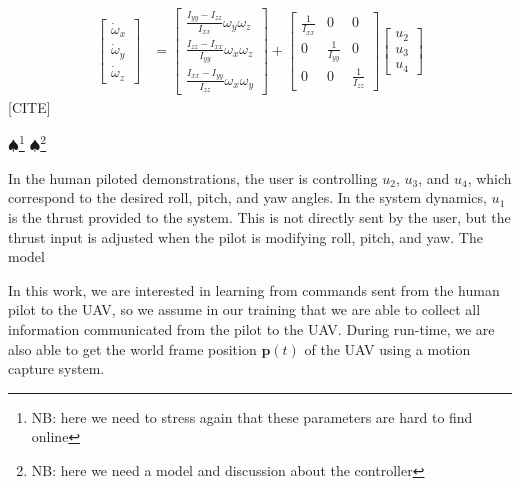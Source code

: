 \documentclass[letterpaper, 10 pt, conference]{ieeeconf}  %
\newcommand\NB[1]{$\spadesuit$\footnote{NB: #1}}
\begin{document}
\begin{equation}
\begin{aligned}
	\begin{bmatrix}\dot{\omega}_{x} \\ \dot{\omega}_{y} \\ \dot{\omega}_{z}\end{bmatrix} &= \begin{bmatrix}\frac{I_{yy} - I_{zz}}{I_{xx}} \omega_{y}\omega_{z}\\ \frac{I_{zz} - I_{xx}}{I_{yy}} \omega_{x}\omega_{z} \\ \frac{I_{xx} - I_{yy}}{I_{zz}} \omega_{x}\omega_{y} \end{bmatrix} +  \begin{bmatrix}\frac{1}{I_{xx}} & 0 & 0\\ 0 & \frac{1}{I_{yy}} & 0\\ 0 & 0 & \frac{1}{I_{zz}}\end{bmatrix} \begin{bmatrix}u_{2} \\ u_{3} \\ u_{4} \end{bmatrix}
	\end{aligned}
	\label{eq:quadrotor_dynamics} \nonumber
\end{equation} [CITE]

\NB{here we need to stress again that these parameters are hard to find online}
\NB{here we need a model and discussion about the controller}


In the human piloted demonstrations, the user is controlling $u_2$, $u_3$, and $u_4$, which correspond to the desired roll, pitch, and yaw angles. In the system dynamics, $u_1$ is the thrust provided to the system. This is not directly sent by the user, but the thrust input is adjusted when the pilot is modifying roll, pitch, and yaw. The model

In this work, we are interested in learning from commands sent from the human pilot to the UAV, so we assume in our training that we are able to collect all information communicated from the pilot to the UAV. During run-time, we are also able to get the world frame position $\mathbf{p}(t)$ of the UAV using a motion capture system.
\end{document}
